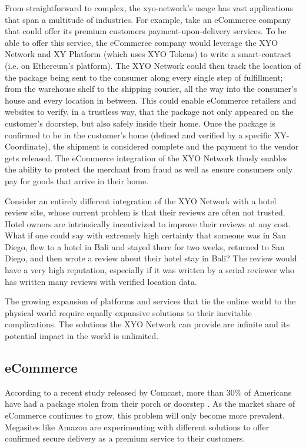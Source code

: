 \documentclass{article}
\begin{document}
From straightforward to complex, the \Gls{xyo-network}'s usage  has vast applications that span a multitude of industries. For example, take an eCommerce company that could offer its premium customers payment-upon-delivery services. To be able to offer this service, the eCommerce company would leverage the XYO Network and XY Platform (which uses XYO Tokens) to write a \gls{smart-contract} (i.e. on Ethereum's platform). The XYO Network could then track the location of the package being sent to the consumer along every single step of fulfillment; from the warehouse shelf to the shipping courier, all the way into the consumer's house and every location in between. This could enable eCommerce retailers and websites to verify, in a \gls{trustless} way, that the package not only appeared on the customer's doorstep, but also safely inside their home. Once the package is confirmed to be in the customer's home (defined and verified by a specific XY-Coordinate), the shipment is considered complete and the payment to the vendor gets released. The eCommerce integration of the XYO Network thusly enables the ability to protect the merchant from fraud as well as ensure consumers only pay for goods that arrive in their home.

Consider an entirely different integration of the XYO Network with a hotel review site, whose current problem is that their reviews are often not trusted. Hotel owners are intrinsically incentivized to improve their reviews at any cost. What if one could say with extremely high \gls{certainty} that someone was in San Diego, flew to a hotel in Bali and stayed there for two weeks, returned to San Diego, and then wrote a review about their hotel stay in Bali? The review would have a very high reputation, especially if it was written by a serial reviewer who has written many reviews with verified location data.

The growing expansion of platforms and services that tie the online world to the physical world require equally expansive solutions to their inevitable complications. The solutions the XYO Network can provide are infinite and its potential impact in the world is unlimited.

\subsection{eCommerce}

According to a recent study released by Comcast, more than 30\% of Americans have had a package stolen from their porch or doorstep \cite{comcast-packagesurvey}. As the market share of eCommerce continues to grow, this problem will only become more prevalent. Megasites like Amazon are experimenting with different solutions to offer confirmed secure delivery as a premium service to their customers.
\end{document}
